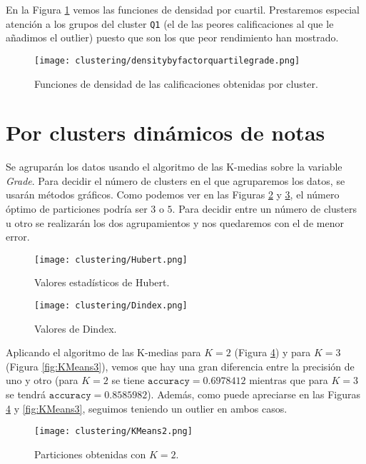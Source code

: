 En la Figura \ref{fig:densitybyfactorquartilegrade} vemos las funciones de densidad por cuartil. Prestaremos especial atención a los grupos del cluster \texttt{Q1} (el de las peores calificaciones al que le añadimos el outlier) puesto que son los que peor rendimiento han mostrado.

\begin{figure}[H]
    \centering
    \texttt{[image: clustering/densitybyfactorquartilegrade.png]}
    \caption{Funciones de densidad de las calificaciones obtenidas por cluster.}
    \label{fig:densitybyfactorquartilegrade}
\end{figure}

\section{Por clusters dinámicos de notas}

Se agruparán los datos usando el algoritmo de las K-medias sobre la variable \emph{Grade}. Para decidir el número de clusters en el que agruparemos los datos, se usarán métodos gráficos. Como podemos ver en las Figuras \ref{fig:indiceshubert} y \ref{fig:indicesdindex}, el número óptimo de particiones podría ser $3$ o $5$. Para decidir entre un número de clusters u otro se realizarán los dos agrupamientos y nos quedaremos con el de menor error.

\begin{figure}[H]
    \centering
    \texttt{[image: clustering/Hubert.png]}
    \caption{Valores estadísticos de Hubert.}
    \label{fig:indiceshubert}
\end{figure}

\begin{figure}[H]
    \centering
    \texttt{[image: clustering/Dindex.png]}
    \caption{Valores de Dindex.}
    \label{fig:indicesdindex}
\end{figure}

Aplicando el algoritmo de las K-medias para $K = 2$ (Figura \ref{fig:KMeans2}) y para $K = 3$ (Figura \ref{fig:KMeans3}), vemos que hay una gran diferencia entre la precisión de uno y otro (para $K = 2$ se tiene $\texttt{accuracy} = 0.6978412$ mientras que para $K = 3$ se tendrá $\texttt{accuracy} = 0.8585982$). Además, como puede apreciarse en las Figuras \ref{fig:KMeans2} y \ref{fig:KMeans3}, seguimos teniendo un outlier en ambos casos.

\begin{figure}[H]
    \centering
    \texttt{[image: clustering/KMeans2.png]}
    \caption{Particiones obtenidas con $K = 2$.}
    \label{fig:KMeans2}
\end{figure}

